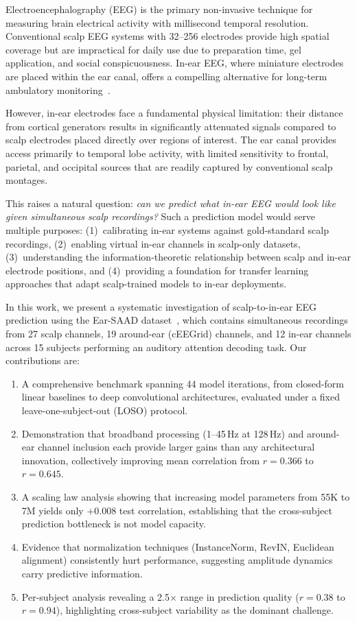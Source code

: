 \documentclass[conference]{IEEEtran}
\begin{document}
Electroencephalography (EEG) is the primary non-invasive technique for measuring brain electrical activity with millisecond temporal resolution. Conventional scalp EEG systems with 32--256 electrodes provide high spatial coverage but are impractical for daily use due to preparation time, gel application, and social conspicuousness. In-ear EEG, where miniature electrodes are placed within the ear canal, offers a compelling alternative for long-term ambulatory monitoring~\cite{ear_saad,kidmose2013study,goverdovsky2017ear}.

However, in-ear electrodes face a fundamental physical limitation: their distance from cortical generators results in significantly attenuated signals compared to scalp electrodes placed directly over regions of interest. The ear canal provides access primarily to temporal lobe activity, with limited sensitivity to frontal, parietal, and occipital sources that are readily captured by conventional scalp montages.

This raises a natural question: \emph{can we predict what in-ear EEG would look like given simultaneous scalp recordings?} Such a prediction model would serve multiple purposes: (1)~calibrating in-ear systems against gold-standard scalp recordings, (2)~enabling virtual in-ear channels in scalp-only datasets, (3)~understanding the information-theoretic relationship between scalp and in-ear electrode positions, and (4)~providing a foundation for transfer learning approaches that adapt scalp-trained models to in-ear deployments.

In this work, we present a systematic investigation of scalp-to-in-ear EEG prediction using the Ear-SAAD dataset~\cite{ear_saad}, which contains simultaneous recordings from 27 scalp channels, 19 around-ear (cEEGrid) channels, and 12 in-ear channels across 15 subjects performing an auditory attention decoding task. Our contributions are:

\begin{enumerate}
    \item A comprehensive benchmark spanning 44 model iterations, from closed-form linear baselines to deep convolutional architectures, evaluated under a fixed leave-one-subject-out (LOSO) protocol.
    \item Demonstration that broadband processing (1--45\,Hz at 128\,Hz) and around-ear channel inclusion each provide larger gains than any architectural innovation, collectively improving mean correlation from $r = 0.366$ to $r = 0.645$.
    \item A scaling law analysis showing that increasing model parameters from 55K to 7M yields only $+0.008$ test correlation, establishing that the cross-subject prediction bottleneck is not model capacity.
    \item Evidence that normalization techniques (InstanceNorm, RevIN, Euclidean alignment) consistently hurt performance, suggesting amplitude dynamics carry predictive information.
    \item Per-subject analysis revealing a 2.5$\times$ range in prediction quality ($r = 0.38$ to $r = 0.94$), highlighting cross-subject variability as the dominant challenge.
\end{enumerate}
\end{document}
